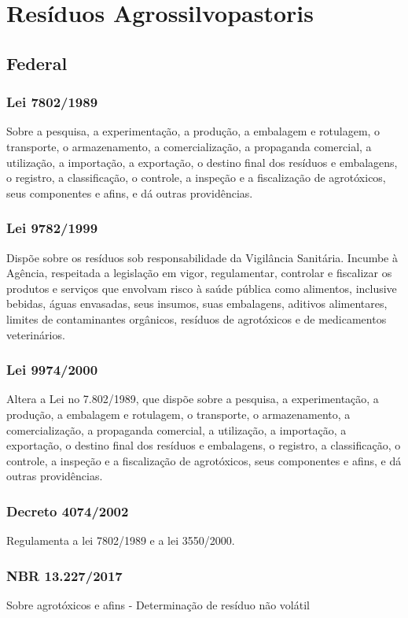  
\section{Resíduos Agrossilvopastoris}
\begin{subapend}
	\subsection{Federal}
	\begin{subsubapend}
		\item \subsubsection{Lei 7802/1989}
		Sobre a pesquisa, a experimentação, a produção, a embalagem e rotulagem, o transporte, o armazenamento, a comercialização, a propaganda comercial, a utilização, a importação, a exportação, o destino final dos resíduos e embalagens, o registro, a classificação, o controle, a inspeção e a fiscalização de agrotóxicos, seus componentes e afins, e dá outras providências.
		\subsubsection{Lei 9782/1999}
		Dispõe sobre os resíduos sob responsabilidade da Vigilância Sanitária. Incumbe à Agência, respeitada a legislação em vigor, regulamentar, controlar e fiscalizar os produtos e serviços que envolvam risco à saúde pública como alimentos, inclusive bebidas, águas envasadas, seus insumos, suas embalagens, aditivos alimentares, limites de contaminantes orgânicos, resíduos de agrotóxicos e de medicamentos veterinários.
		\subsubsection{Lei 9974/2000}
		Altera a Lei no 7.802/1989, que dispõe sobre a pesquisa, a experimentação, a produção, a embalagem e rotulagem, o transporte, o armazenamento, a comercialização, a propaganda comercial, a utilização, a importação, a exportação, o destino final dos resíduos e embalagens, o registro, a classificação, o controle, a inspeção e a fiscalização de agrotóxicos, seus componentes e afins, e dá outras providências.
		\subsubsection{Decreto 4074/2002}
		Regulamenta a lei 7802/1989 e a lei 3550/2000.
		\subsubsection{NBR 13.227/2017}
		Sobre agrotóxicos e afins - Determinação de resíduo não volátil

\end{subsubapend}
\end{subapend}
